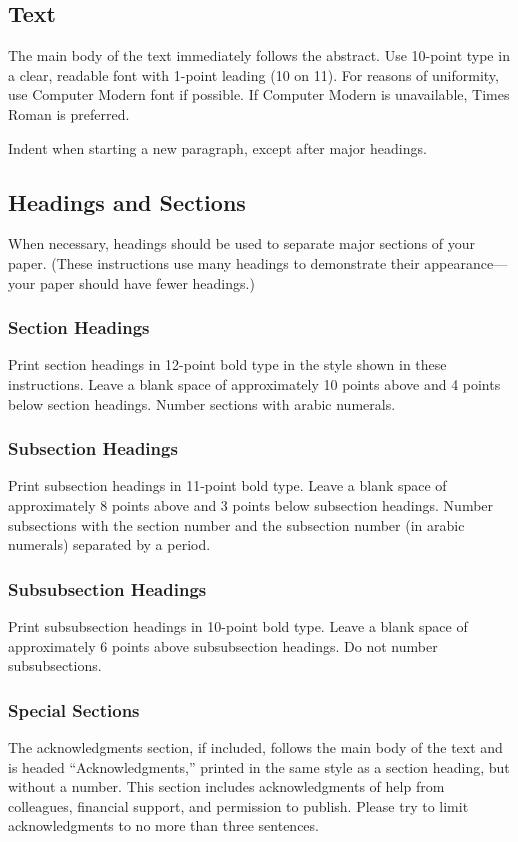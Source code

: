 \documentclass{article}
\begin{document}
\subsection{Text}

The main body of the text immediately follows the abstract. 
Use 10-point type in a clear, readable font with 1-point leading (10 on
11).  For reasons of uniformity, use Computer Modern font if possible.  If
Computer Modern is unavailable, Times Roman is preferred.

Indent when starting a new paragraph, except after major headings.

\subsection{Headings and Sections}

When necessary, headings should be used to separate major sections of your
paper.
(These instructions use many headings to demonstrate their
appearance---your paper should have fewer headings.)

\subsubsection{Section Headings}

Print section headings in 12-point bold type in the style shown in these
instructions.  Leave a blank space of approximately 10 points above and 4
points below section headings.  Number sections with arabic numerals.

\subsubsection{Subsection Headings}

Print subsection headings in 11-point bold type.  Leave a blank space of
approximately 8 points above and 3 points below subsection headings.
Number subsections with the section number and the subsection number (in
arabic numerals) separated by a period.

\subsubsection{Subsubsection Headings}

Print subsubsection headings in 10-point bold type.  Leave a blank space of
approximately 6 points above subsubsection headings.  Do not number
subsubsections.

\subsubsection{Special Sections}
The acknowledgments section, if included, follows the main body of the text
and is headed ``Acknowledgments,'' printed in the same style as a section
heading, but without a number. 
This section includes acknowledgments of help from
colleagues, financial support, and permission to publish.  
Please try to limit acknowledgments to no more than three sentences.
\end{document}
